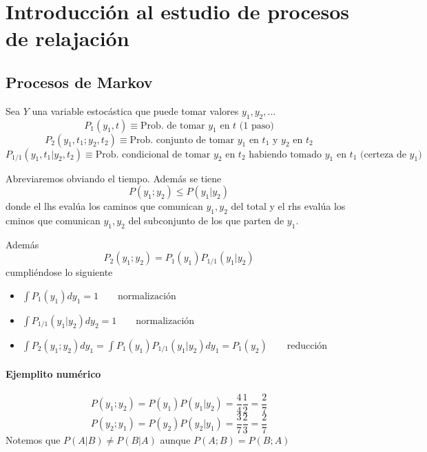 \documentclass[10pt,oneside]{CBFT_book}
\begin{document}
\chapter{Introducción al estudio de procesos de relajación}


\section{Procesos de Markov}

Sea $Y$ una variable estocástica que puede tomar valores $y_1, y_2,...$
\[
	P_1(y_1,t) \equiv \text{Prob. de tomar $y_1$ en $t$ (1 paso)}
\]
\[
	P_2(y_1,t_1;y_2,t_2) \equiv \text{Prob. conjunto de tomar $y_1$ en $t_1$ y $y_2$ en $t_2$}
\]
\[
	P_{1/1}(y_1,t_1 | y_2, t_2) \equiv \text{Prob. condicional de tomar $y_2$ en $t_2$ habiendo 
	tomado $y_1$ en $t_1$ (certeza de $y_1$) }
\]

Abreviaremos obviando el tiempo. Además se tiene 
\[
	P(y_1;y_2) \leq P(y_1 | y_2)
\]
donde el lhs evalúa los caminos que comunican $y_1, y_2$ del total y el rhs evalúa los cminos que comunican
$y_1, y_2$ del subconjunto de los que parten de $y_1$.

Además
\[
	P_2(y_1;y_2) = P_1(y_1) P_{1/1}(y_1|y_2)
\]
cumpliéndose lo siguiente
\begin{itemize}
 \item $ \int P_1(y_1) dy_1 = 1 \qquad  \text{normalización} $ 
 \item $ \int P_{1/1}(y_1|y_2) dy_2 = 1 \qquad \text{normalización} $ 
 \item $ \int P_2(y_1;y_2) dy_1 = \int P_1(y_1) P_{1/1}(y_1|y_2) dy_1 =  P_1(y_2) \qquad \text{reducción} $
\end{itemize}

\subsubsection{Ejemplito numérico}

\[
	P(y_1;y_2) = P(y_1)P(y_1|y_2) = \frac{4}{4}\frac{1}{2} = \frac{2}{7}
\]
\[
	P(y_2;y_1) = P(y_2)P(y_2|y_1)  = \frac{3}{7}\frac{2}{3} = \frac{2}{7}
\]
Notemos que $P(A|B) \neq P(B|A)$ aunque $P(A;B) = P(B;A)$
\end{document}
